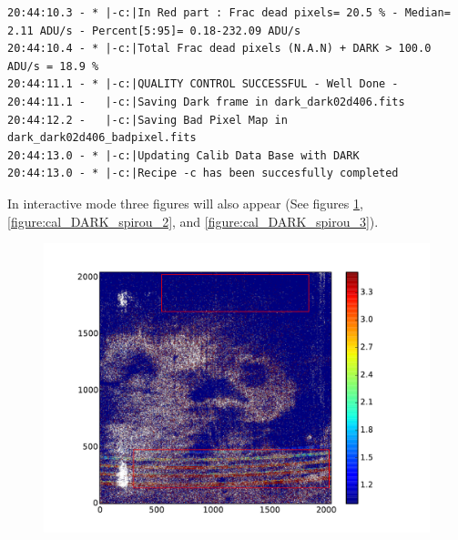 \begin{lstlisting}[style=text]
20:44:10.3 - * |-c:|In Red part : Frac dead pixels= 20.5 % - Median= 2.11 ADU/s - Percent[5:95]= 0.18-232.09 ADU/s
20:44:10.4 - * |-c:|Total Frac dead pixels (N.A.N) + DARK > 100.0 ADU/s = 18.9 %
20:44:11.1 - * |-c:|QUALITY CONTROL SUCCESSFUL - Well Done -
20:44:11.1 -   |-c:|Saving Dark frame in dark_dark02d406.fits                                                                                      
20:44:12.2 -   |-c:|Saving Bad Pixel Map in dark_dark02d406_badpixel.fits                                                                            
20:44:13.0 - * |-c:|Updating Calib Data Base with DARK                                                                                                  
20:44:13.0 - * |-c:|Recipe -c has been succesfully completed

\end{lstlisting}

In interactive mode three figures will also appear (See figures \ref{figure:cal_DARK_spirou_1}, \ref{figure:cal_DARK_spirou_2}, and \ref{figure:cal_DARK_spirou_3}).

\begin{figure}
\begin{center}
\includegraphics[width=.8\textwidth]{figures/cal_DARK_spirou_1.pdf}
\caption{\label{figure:cal_DARK_spirou_1}}
\end{center}
\end{figure}

